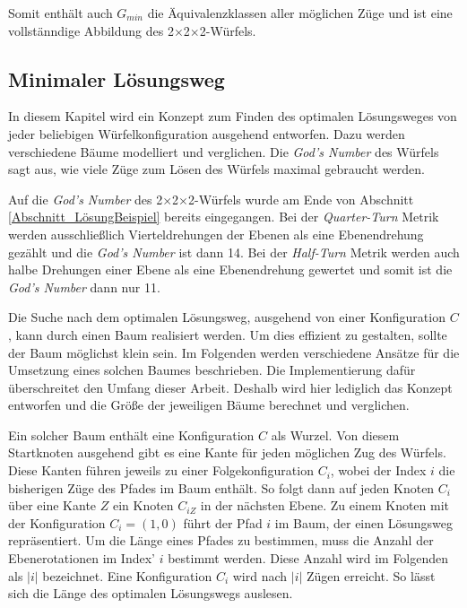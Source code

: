 \documentclass[12pt,a4paper, usenames, dvipsnames]{article}
\theoremstyle{mystyle}
\theoremstyle{definition}
\newcommand{\Ttwo}{2$\times$2$\times$2-}
\begin{document}
Somit enthält auch $G_{min}$ die Äquivalenzklassen aller möglichen Züge und ist eine vollstänndige Abbildung des \Ttwo Würfels.

%
%
%
%
%
%
%
%
%
%
%
%
%
%
%
%
%
%
\subsection{Minimaler Lösungsweg}

\label{Abschnitt_MinLösung}

In diesem Kapitel wird ein Konzept zum Finden des optimalen Lösungsweges von jeder beliebigen Würfelkonfiguration ausgehend entworfen. Dazu werden verschiedene Bäume modelliert und verglichen. Die \textit{God's Number} des Würfels sagt aus, wie viele Züge zum Lösen des Würfels maximal gebraucht werden.

Auf die \textit{God's Number} des \Ttwo Würfels wurde am Ende von Abschnitt \ref{Abschnitt_LösungBeispiel} bereits eingegangen. Bei der \textit{Quarter-Turn} Metrik werden ausschließlich Vierteldrehungen der Ebenen als eine Ebenendrehung gezählt und die \textit{God's Number} ist dann 14. Bei der \textit{Half-Turn} Metrik werden auch halbe Drehungen einer Ebene als eine Ebenendrehung gewertet und somit ist die \textit{God's Number} dann nur 11.

Die Suche nach dem optimalen Lösungsweg, ausgehend von einer Konfiguration $C$, kann durch einen Baum realisiert werden. Um dies effizient zu gestalten, sollte der Baum möglichst klein sein. Im Folgenden werden verschiedene Ansätze für die Umsetzung eines solchen Baumes beschrieben. Die Implementierung dafür überschreitet den Umfang dieser Arbeit. Deshalb wird hier lediglich das Konzept entworfen und die Größe der jeweiligen Bäume berechnet und verglichen. 

Ein solcher Baum enthält eine Konfiguration $C$ als Wurzel. Von diesem Startknoten ausgehend gibt es eine Kante für jeden möglichen Zug des Würfels. Diese Kanten führen jeweils zu einer Folgekonfiguration $C_i$, wobei der Index $i$ die bisherigen Züge des Pfades im Baum enthält. So folgt dann auf jeden Knoten $C_i$ über eine Kante $Z$ ein Knoten $C_{iZ}$ in der nächsten Ebene. Zu einem Knoten mit der Konfiguration $C_i=(1,0)$ führt der Pfad $i$ im Baum, der einen Lösungsweg repräsentiert. Um die Länge eines Pfades zu bestimmen, muss die Anzahl der Ebenerotationen im Index' $i$ bestimmt werden. Diese Anzahl wird im Folgenden als $|i|$ bezeichnet. Eine Konfiguration $C_i$ wird nach $|i|$ Zügen erreicht. So lässt sich die Länge des optimalen Lösungswegs auslesen.
\end{document}
